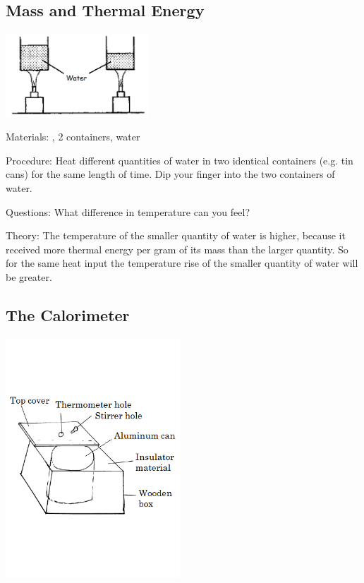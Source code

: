 \begin{multicols}{2}
\subsection{Mass and Thermal Energy}

\begin{center}
\includegraphics[width=0.4\textwidth]{./img/source/thermal-energy.png}
\end{center}

\begin{description*}
\item[Materials:]{, 2 containers, water}
\item[Procedure:]{Heat different quantities of water in two identical containers (e.g. tin cans) for the same length of time. Dip your finger into the two containers of water.}
\item[Questions:]{What difference in temperature can you feel?}
\item[Theory:]{The temperature of the smaller quantity of water is higher, because it received more thermal energy per gram of its mass than the larger quantity. So for the same heat input the temperature rise of the smaller quantity of water will be greater.}
\end{description*}

\subsection{The Calorimeter} 

\begin{center}
\includegraphics[width=0.49\textwidth]{./img/calorimeter.png}
\end{center}


\end{multicols}
